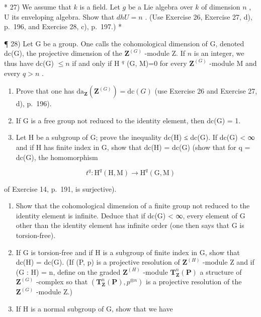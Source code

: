 * 27) We assume that \(k\) is a field. Let \(g\) be a Lie algebra over \(k\) of dimension \(n\) , U its enveloping algebra. Show that \(dhU = n\) . (Use Exercise 26, Exercise 27, d), p.~196, and Exercise 28, c), p.~197.) *

¶ 28) Let G be a group. One calls the cohomological dimension of G, denoted dc(G), the projective dimension of the \(\mathbf{Z}^{(G)}\) -module Z. If \(n\) is an integer, we thus have dc(G) \(\leqslant n\) if and only if H \(^{q}\) (G, M)=0 for every \(\mathbf{Z}^{(G)}\) -module M and every \(q > n\) .

\begin{enumerate}
\def\labelenumi{\alph{enumi})}
\item
  Prove that one has \(\mathrm{da}_{\mathbf{Z}}(\mathbf{Z}^{(G)}) = \mathrm{dc}(G)\) (use Exercise 26 and Exercise 27, d), p.~196).
\item
  If G is a free group not reduced to the identity element, then dc(G) = 1.
\item
  Let H be a subgroup of G; prove the inequality dc(H) ≤ dc(G). If dc(G) \textless{} ∞ and if H has finite index in G, show that dc(H) = dc(G) (show that for q = dc(G), the homomorphism
\end{enumerate}

\[
t ^ {q}: \mathrm{H} ^ {q} (\mathrm{H}, \mathrm{M}) \rightarrow \mathrm{H} ^ {q} (\mathrm{G}, \mathrm{M})
\]

of Exercise 14, p.~191, is surjective).

\begin{enumerate}
\def\labelenumi{\alph{enumi})}
\setcounter{enumi}{3}
\item
  Show that the cohomological dimension of a finite group not reduced to the identity element is infinite. Deduce that if dc(G) \textless{} ∞, every element of G other than the identity element has infinite order (one then says that G is torsion-free).
\item
  If G is torsion-free and if H is a subgroup of finite index in G, show that dc(H) = dc(G). (If (P, p) is a projective resolution of \(\mathbf{Z}^{(H)}\) -module Z and if (G : H) = n, define on the graded \(\mathbf{Z}^{(H)}\) -module \(\mathbf{T}_{\mathbf{Z}}^{n}(\mathbf{P})\) a structure of \(\mathbf{Z}^{(G)}\) -complex so that \((\mathbf{T}_{\mathbf{Z}}^{n}(\mathbf{P}), p^{\otimes n})\) is a projective resolution of the \(\mathbf{Z}^{(G)}\) -module Z.)
\item
  If H is a normal subgroup of G, show that we have
\end{enumerate}

